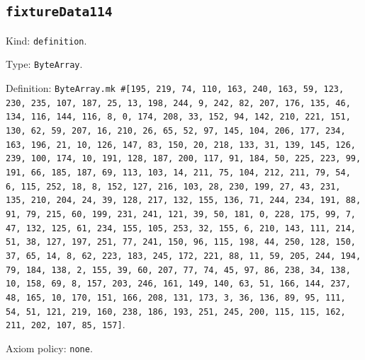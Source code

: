 \documentclass[11pt]{article}
\begin{document}
\subsection*{\texttt{fixtureData114}}
\noindent Kind: \texttt{definition}.\par
\noindent Type: \texttt{ByteArray}.\par
\noindent Definition: \texttt{ByteArray.mk \#[195, 219, 74, 110, 163, 240, 163, 59, 123, 230, 235, 107, 187, 25, 13, 198, 244, 9, 242, 82, 207, 176, 135, 46, 134, 116, 144, 116, 8, 0, 174, 208, 33, 152, 94, 142, 210, 221, 151, 130, 62, 59, 207, 16, 210, 26, 65, 52, 97, 145, 104, 206, 177, 234, 163, 196, 21, 10, 126, 147, 83, 150, 20, 218, 133, 31, 139, 145, 126, 239, 100, 174, 10, 191, 128, 187, 200, 117, 91, 184, 50, 225, 223, 99, 191, 66, 185, 187, 69, 113, 103, 14, 211, 75, 104, 212, 211, 79, 54, 6, 115, 252, 18, 8, 152, 127, 216, 103, 28, 230, 199, 27, 43, 231, 135, 210, 204, 24, 39, 128, 217, 132, 155, 136, 71, 244, 234, 191, 88, 91, 79, 215, 60, 199, 231, 241, 121, 39, 50, 181, 0, 228, 175, 99, 7, 47, 132, 125, 61, 234, 155, 105, 253, 32, 155, 6, 210, 143, 111, 214, 51, 38, 127, 197, 251, 77, 241, 150, 96, 115, 198, 44, 250, 128, 150, 37, 65, 14, 8, 62, 223, 183, 245, 172, 221, 88, 11, 59, 205, 244, 194, 79, 184, 138, 2, 155, 39, 60, 207, 77, 74, 45, 97, 86, 238, 34, 138, 10, 158, 69, 8, 157, 203, 246, 161, 149, 140, 63, 51, 166, 144, 237, 48, 165, 10, 170, 151, 166, 208, 131, 173, 3, 36, 136, 89, 95, 111, 54, 51, 121, 219, 160, 238, 186, 193, 251, 245, 200, 115, 115, 162, 211, 202, 107, 85, 157]}.\par
\noindent Axiom policy: \texttt{none}.\par
\end{document}
